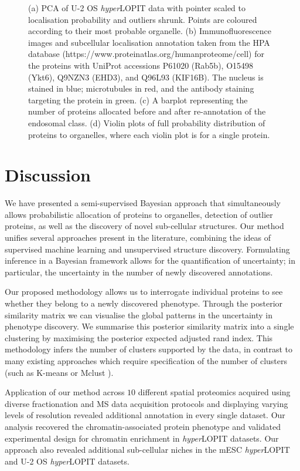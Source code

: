 \documentclass[12pt,english]{article}
\begin{document}
\begin{figure}[h]
\begin{subfigure}[t]{1\textwidth}
		\caption{}
	\end{subfigure}
	\caption{(a) PCA of U-2 OS \textit{hyper}LOPIT data with pointer scaled to localisation probability and outliers shrunk. Points are coloured according to their most probable organelle. (b) Immunofluorescence images and subcellular localisation annotation taken from the HPA database (https://www.proteinatlas.org/humanproteome/cell) for the proteins with UniProt accessions P61020 (Rab5b), O15498 (Ykt6), Q9NZN3 (EHD3), and Q96L93 (KIF16B). The nucleus is stained in blue; microtubules in red, and the antibody staining targeting the protein in green. (c) A barplot representing the number of proteins allocated before and after re-annotation of the endosomal class. (d) Violin plots of full probability distribution of proteins to organelles, where each violin plot is for a single protein.
	}
	\label{figure:u2os}
\end{figure}
\clearpage 
\section{Discussion}
We have presented a semi-supervised Bayesian approach that simultaneously allows probabilistic allocation of proteins to organelles, detection of outlier proteins, as well as the discovery of novel sub-cellular structures. Our method unifies several approaches present in the literature, combining the ideas of supervised machine learning and unsupervised structure discovery. Formulating inference in a Bayesian framework allows for the quantification of uncertainty; in particular, the uncertainty in the number of newly discovered annotations.

Our proposed methodology allows us to interrogate individual proteins to see whether they belong to a newly discovered phenotype. Through the posterior similarity matrix we can visualise the global patterns in the uncertainty in phenotype discovery. We summarise this posterior similarity matrix into a single clustering by maximising the posterior expected adjusted rand index. This methodology infers the number of clusters supported by the data, in contrast to many existing approaches which require specification of the number of clusters (such as K-means or Mclust \citep{mclust}).

Application of our method across $10$ different spatial proteomics acquired using diverse fractionation and MS data acquisition protocols and displaying varying levels of resolution revealed additional annotation in every single dataset. Our analysis recovered the chromatin-associated protein phenotype and validated experimental design for chromatin enrichment in \textit{hyper}LOPIT datasets. Our approach also revealed additional sub-cellular niches in the mESC \textit{hyper}LOPIT and U-2 OS \textit{hyper}LOPIT datasets.
\end{document}
